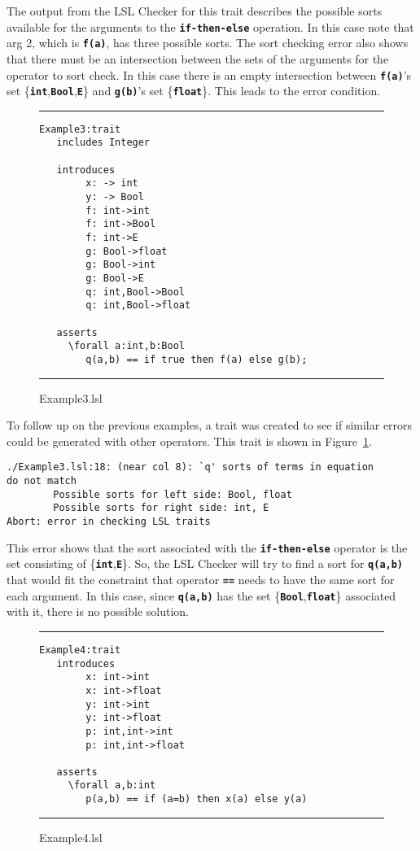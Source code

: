\documentclass[12pt]{article} %
\newcommand{\reserved}[1]{\textbf{\texttt{#1}}} %
\newcommand{\UNSPACEFORBOX}{\vspace{-2ex}}
\newcommand{\HLINE}{\UNSPACEFORBOX%
\begin{flushleft}\rule{\textwidth}{0.01in}\end{flushleft}%
\UNSPACEFORBOX}
\newenvironment{BFIGURE}{

\begin{figure}
\small
\HLINE
}{
\HLINE
\normalsize
\end{figure}
}
\begin{document}
The output from the LSL Checker for this trait describes the possible
sorts available for the arguments to the \reserved{if-then-else}
operation. In this case note that arg 2, which is \reserved{f(a)}, has
three possible sorts. The sort checking error also shows that there
must be an intersection between the sets of the arguments for the
operator to sort check. In this case there is an empty intersection between
\reserved{f(a)}'s set \{\reserved{int},\reserved{Bool},\reserved{E}\}
and \reserved{g(b)}'s set \{\reserved{float}\}. This leads to the
error condition.

\begin{BFIGURE}
\begin{verbatim}
Example3:trait
   includes Integer

   introduces
        x: -> int
        y: -> Bool
        f: int->int
        f: int->Bool
        f: int->E
        g: Bool->float
        g: Bool->int
        g: Bool->E
        q: int,Bool->Bool
        q: int,Bool->float

   asserts
     \forall a:int,b:Bool
        q(a,b) == if true then f(a) else g(b);
\end{verbatim}
\caption{Example3.lsl}
\label{lslex3}
\end{BFIGURE}

To follow up on the previous examples, a trait was created to see if
similar errors could be generated with other operators. This trait is
shown in Figure~\ref{lslex3}. 
\begin{verbatim}
./Example3.lsl:18: (near col 8): `q' sorts of terms in equation 
do not match
        Possible sorts for left side: Bool, float
        Possible sorts for right side: int, E
Abort: error in checking LSL traits
\end{verbatim}

\noindent This error shows that the sort associated with the
\reserved{if-then-else} operator is the set consisting of
\{\reserved{int},\reserved{E}\}. So, the LSL Checker will try to find
a sort for \reserved{q(a,b)} that would fit the constraint that
operator \reserved{==} needs to have the same sort for each
argument. In this case, since \reserved{q(a,b)} has the set
\{\reserved{Bool},\reserved{float}\} associated with it, there is no
possible solution.

\begin{BFIGURE}
\begin{verbatim}
Example4:trait
   introduces
        x: int->int
        x: int->float
        y: int->int
        y: int->float
        p: int,int->int
        p: int,int->float

   asserts
     \forall a,b:int
        p(a,b) == if (a=b) then x(a) else y(a)
\end{verbatim}
\caption{Example4.lsl}
\label{lslex4}
\end{BFIGURE}
\end{document}
